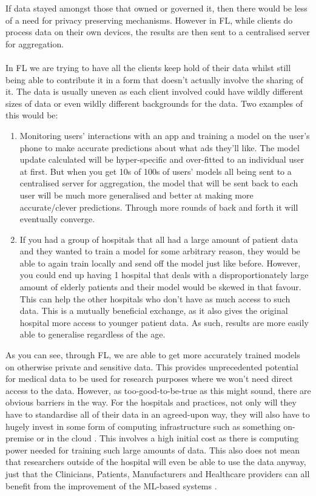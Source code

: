 If data stayed amongst those that owned or governed it, then there would be less of a need for privacy preserving mechanisms. 
However in FL, while clients do process data on their own devices, the results are then sent to a centralised server for aggregation. 
\\ \\
In FL we are trying to have all the clients keep hold of their data whilst still being able to contribute it in a form that doesn't actually involve the sharing of it. The data is usually uneven as each client involved could have wildly different sizes of data or even wildly different backgrounds for the data. Two examples of this would be:
\begin{enumerate}
    \item Monitoring users' interactions with an app and training a model on the user's phone to make accurate predictions about what ads they'll like. 
    The model update calculated will be hyper-specific and over-fitted to an individual user at first. 
    But when you get 10s of 100s of users' models all being sent to a centralised server for aggregation, the model that will be sent back to each user will be much more generalised and better at making more accurate/clever predictions. 
    Through more rounds of back and forth it will eventually converge.
    
    \item If you had a group of hospitals that all had a large amount of patient data and they wanted to train a model for some arbitrary reason, they would be able to again train locally and send off the model just like before. 
    However, you could end up having 1 hospital that deals with a disproportionately large amount of elderly patients and their model would be skewed in that favour. 
    This can help the other hospitals who don't have as much access to such data. 
    This is a mutually beneficial exchange, as it also gives the original hospital more access to younger patient data. 
    As such, results are more easily able to generalise regardless of the age.
\end{enumerate}
As you can see, through FL, we are able to get more accurately trained models on otherwise private and sensitive data. 
This provides unprecedented potential for medical data to be used for research purposes where we won't need direct access to the data. However, as too-good-to-be-true as this might sound, there are obvious barriers in the way. 
For the hospitals and practices, not only will they have to standardise all of their data in an agreed-upon way, they will also have to hugely invest in some form of computing infrastructure such as something on-premise or in the cloud \cite{future_health_fl}. 
This involves a high initial cost as there is computing power needed for training such large amounts of data. 
This also does not mean that researchers outside of the hospital will even be able to use the data anyway, just that the Clinicians, Patients, Manufacturers and Healthcare providers can all benefit from the improvement of the ML-based systems \cite{future_health_fl}.

